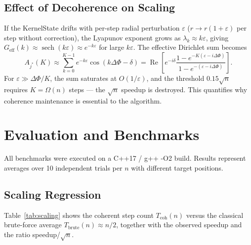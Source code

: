 \documentclass[12pt,a4paper]{article}
\theoremstyle{plain}
\theoremstyle{definition}
\theoremstyle{remark}
\begin{document}
\subsection{Effect of Decoherence on Scaling}

If the KernelState drifts with per-step radial perturbation $\varepsilon$
($r \to r(1+\varepsilon)$ per step without correction), the Lyapunov
exponent grows as $\lambda_k \approx k\varepsilon$, giving
$G_{\text{eff}}(k) \approx \operatorname{sech}(k\varepsilon) \approx
e^{-k\varepsilon}$ for large $k\varepsilon$.  The effective Dirichlet sum
becomes
\begin{equation}
  A_{j^*}(K)
  \approx \sum_{k=0}^{K-1}
    e^{-k\varepsilon}\cos(k\Delta\Phi - \delta)
  = \operatorname{Re}\!\left[
      e^{-i\delta}\frac{1 - e^{-K(\varepsilon-i\Delta\Phi)}}
                       {1 - e^{-(\varepsilon-i\Delta\Phi)}}
    \right].
  \label{eq:decoherent-sum}
\end{equation}
For $\varepsilon \gg \Delta\Phi/K$, the sum saturates at
$O(1/\varepsilon)$, and the threshold $0.15\sqrt{n}$ requires
$K = \Omega(n)$ steps — the $\sqrt{n}$ speedup is destroyed.
This quantifies why coherence maintenance is essential to the algorithm.

\section{Evaluation and Benchmarks}
\label{sec:benchmarks}

All benchmarks were executed on a C++17 / g++ -O2 build.
Results represent averages over 10 independent trials per $n$ with
different target positions.

\subsection{Scaling Regression}

Table~\ref{tab:scaling} shows the coherent step count $T_{\text{coh}}(n)$
versus the classical brute-force average $T_{\text{brute}}(n) \approx n/2$,
together with the observed speedup and the ratio speedup/$\sqrt{n}$.
\end{document}
